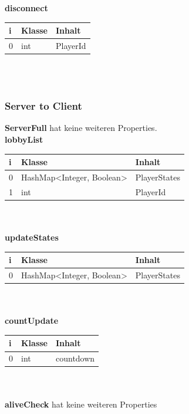 \documentclass[11pt]{scrartcl}
\begin{document}
\textbf{disconnect}\\

\begin{tabularx}{\linewidth}{l l l}
	\textbf{i} & \textbf{Klasse} & \textbf{Inhalt}\\
	\hline
	0 & int & PlayerId\\
\end{tabularx}\\\\


\subsubsection{Server to Client}
\textbf{ServerFull} hat keine weiteren Properties.\\

\textbf{lobbyList}\\

\begin{tabularx}{\linewidth}{l l l}
	\textbf{i} & \textbf{Klasse} & \textbf{Inhalt}\\
	\hline
	0 & HashMap<Integer, Boolean> & PlayerStates\\
	1 & int & PlayerId\\
\end{tabularx}\\\\

\textbf{updateStates}\\

\begin{tabularx}{\linewidth}{l l l}
	\textbf{i} & \textbf{Klasse} & \textbf{Inhalt}\\
	\hline
	0 & HashMap<Integer, Boolean> & PlayerStates\\
\end{tabularx}\\\\

\textbf{countUpdate}\\

\begin{tabularx}{\linewidth}{l l l}
	\textbf{i} & \textbf{Klasse} & \textbf{Inhalt}\\
	\hline
	0 & int & countdown\\
\end{tabularx}\\\\

\textbf{aliveCheck} hat keine weiteren Properties\\
\end{document}
